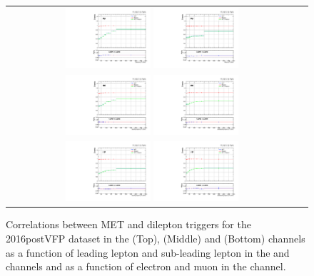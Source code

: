 \begin{figure}[htb]
  \begin{center}
    \begin{tabular}{cc}
      \includegraphics[width=0.30\textwidth]{fig_2016postVFP_TrigSF/g_lepApt_emu_alpha.pdf}
      \includegraphics[width=0.30\textwidth]{fig_2016postVFP_TrigSF/g_lepBpt_emu_alpha.pdf}\\
      \includegraphics[width=0.30\textwidth]{fig_2016postVFP_TrigSF/g_lepApt_ee_alpha.pdf}
      \includegraphics[width=0.30\textwidth]{fig_2016postVFP_TrigSF/g_lepBpt_ee_alpha.pdf}\\
      \includegraphics[width=0.30\textwidth]{fig_2016postVFP_TrigSF/g_lepApt_mumu_alpha.pdf}
      \includegraphics[width=0.30\textwidth]{fig_2016postVFP_TrigSF/g_lepBpt_mumu_alpha.pdf}\\
    \end{tabular}
    \caption{Correlations between MET and dilepton triggers for the 2016postVFP dataset in the \emu (Top), \ee (Middle) and \mumu (Bottom) channels as a function of leading lepton \pT and sub-leading lepton \pT in the \ee and \mumu channels and as a function of electron \pT and muon \pT in the \emu channel.}
    \label{TrigSF_2016postVFP_5}
  \end{center}
\end{figure}


